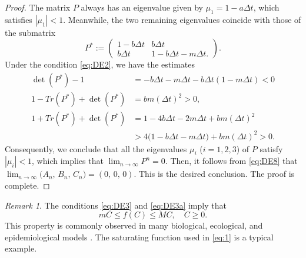 \documentclass[12pt]{article}
\theoremstyle{definition}
\theoremstyle{remark}
\newtheorem{remark}[theorem]{Remark}
\numberwithin{equation}{section}
\begin{document}
{\begin{proof}
The matrix $P$ always has an eigenvalue given by $\mu_1 = 1 - a\Delta t$, which satisfies $|\mu_1| < 1$. Meanwhile, the two remaining eigenvalues coincide with those of the submatrix
%
\begin{equation*}
P^* :=
\begin{pmatrix}
1 - b\Delta t& b\Delta t\\
b\Delta t & 1 - b\Delta t - m\Delta t.
\end{pmatrix}.
\end{equation*}
%
Under the condition \eqref{eq:DE2}, we have the estimates
%
\begin{equation*}
\begin{split}
\det(P^*) - 1 &= -b\Delta t - m\Delta t - b\Delta t(1 - m\Delta t) < 0\\
1 - Tr(P^*) + \det(P^*) &=  bm(\Delta t)^2> 0,\\
1 + Tr(P^*) + \det(P^*) &= 1 - 4b\Delta t - 2m\Delta t +  bm(\Delta t)^2\\
&> 4\big(1 - b\Delta t - m\Delta t\big) + bm(\Delta t)^2 > 0.
\end{split}
\end{equation*}
Consequently, we conclude that all the eigenvalues $\mu_i$ ($i = 1, 2, 3$) of $P$ satisfy $|\mu_i| < 1$, which implies that $\lim_{n \to \infty}P^n = 0$. Then, it follows from \eqref{eq:DE8} that $\lim_{n \to \infty}\big(A_n,\,B_n,\,C_n\big) = (0,\,0,\,0)$. This is the desired conclusion. The proof is complete.
\end{proof}





\begin{remark}
The conditions \eqref{eq:DE3} and \eqref{eq:DE3a} imply that
\begin{equation*}
mC \leq f(C) \leq MC, \quad C \geq 0.
\end{equation*}
This property is commonly observed in many biological, ecological, and epidemiological models \cite{Allen1, Smith}. The saturating function used in \eqref{eq:1} is a typical example.
\end{remark}
}
\end{document}
